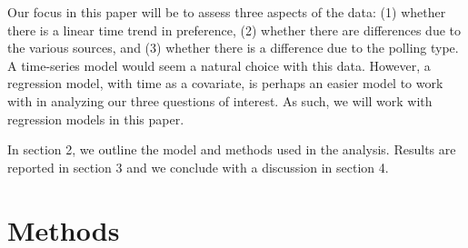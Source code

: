 \documentclass{asaproc}
\begin{document}
Our focus in this paper will be to assess three aspects of the data: (1) whether there is a linear time trend in preference, (2) whether there are differences due to the various sources, and (3) whether there is a difference due to the polling type. A time-series model would seem a natural choice with this data. However, a regression model, with time as a covariate, is perhaps an easier model to work with in analyzing our three questions of interest. As such, we will work with regression models in this paper.

In section 2, we outline the model and methods used in the analysis. Results are reported in section 3 and we conclude with a discussion in section 4.

\section{Methods}
\end{document}
